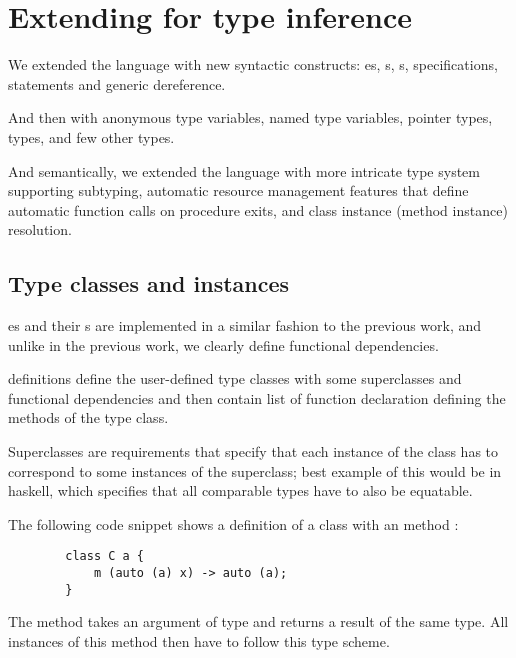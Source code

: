 
\section{Extending \cmm{} for type inference}

We extended the language with new syntactic constructs: es, s, s,  specifications,  statements and \li{[ptr]} generic dereference.

And then with  anonymous type variables,  named type variables,  pointer types,  types, and few other types.

And semantically, we extended the language with more intricate type system supporting subtyping, automatic resource management features that define automatic function calls on procedure exits, and class instance (method instance) resolution.

\subsection{Type classes and instances}

es and their s are implemented in a similar fashion to the previous work, and unlike in the previous work, we clearly define functional dependencies.

 definitions define the user-defined type classes with some superclasses and functional dependencies and then contain list of function declaration defining the methods of the type class.

Superclasses are requirements that specify that each instance of the class has to correspond to some instances of the superclass; best example of this would be  in haskell, which specifies that all comparable types have to also be equatable.

\begin{ex}[Classes]
    The following code snippet shows a definition of a class  with an method :

    \begin{lstlisting}
        class C a {
            m (auto (a) x) -> auto (a);
        }
    \end{lstlisting}

    The method  takes an argument of type  and returns a result of the same type. All instances of this method then have to follow this type scheme.
\end{ex}

